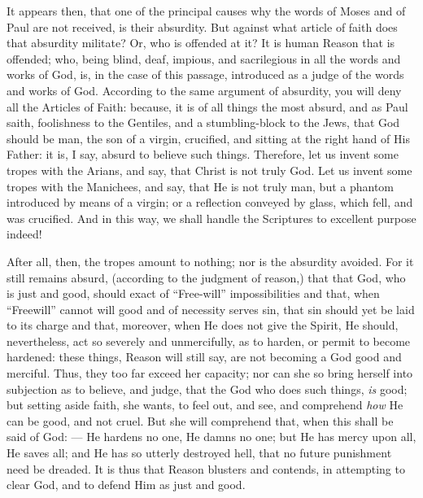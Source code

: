 It appears then, that one of the principal causes why the words of Moses and of Paul are not received, is their absurdity. But against what article of faith does that absurdity militate? Or, who is offended at it? It is human Reason that is offended; who, being blind, deaf, impious, and sacrilegious in all the words and works of God, is, in the case of this passage, introduced as a judge of the words and works of God. According to the same argument of absurdity, you will deny all the Articles of Faith: because, it is of all things the most absurd, and as Paul saith, foolishness to the Gentiles, and a stumbling-block to the Jews, that God should be man, the son of a virgin, crucified, and sitting at the right hand of His Father: it is, I say, absurd to believe such things. Therefore, let us invent some tropes with the Arians, and say, that Christ is not truly God. Let us invent some tropes with the Manichees, and say, that He is not truly man, but a phantom introduced by means of a virgin; or a reflection conveyed by glass, which fell, and was crucified. And in this way, we shall handle the Scriptures to excellent purpose indeed!

After all, then, the tropes amount to nothing; nor is the absurdity avoided. For it still remains absurd, (according to the judgment of reason,) that that God, who is just and good, should exact of “Free-will” impossibilities and that, when “Freewill” cannot will good and of necessity serves sin, that sin should yet be laid to its charge and that, moreover, when He does not give the Spirit, He should, nevertheless, act so severely and unmercifully, as to harden, or permit to become hardened: these things, Reason will still say, are not becoming a God good and merciful. Thus, they too far exceed her capacity; nor can she so bring herself into subjection as to believe, and judge, that the God who does such things, \emph{is }good; but setting aside faith, she wants, to feel out, and see, and comprehend \emph{how }He can be good, and not cruel. But she will comprehend that, when this shall be said of God: — He hardens no one, He damns no one; but He has mercy upon all, He saves all; and He has so utterly destroyed hell, that no future punishment need be dreaded. It is thus that Reason blusters and contends, in attempting to clear God, and to defend Him as just and good.

